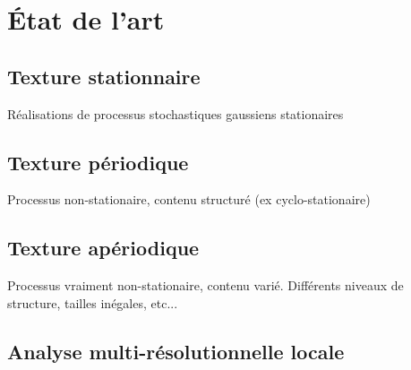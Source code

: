 \chapter{État de l'art}

\section{Texture stationnaire}

Réalisations de processus stochastiques gaussiens stationaires

\section{Texture périodique}

Processus non-stationaire, contenu structuré (ex cyclo-stationaire)

\section{Texture apériodique}

Processus vraiment non-stationaire, contenu varié. Différents niveaux de structure, tailles inégales, etc...

\section{Analyse multi-résolutionnelle locale}


